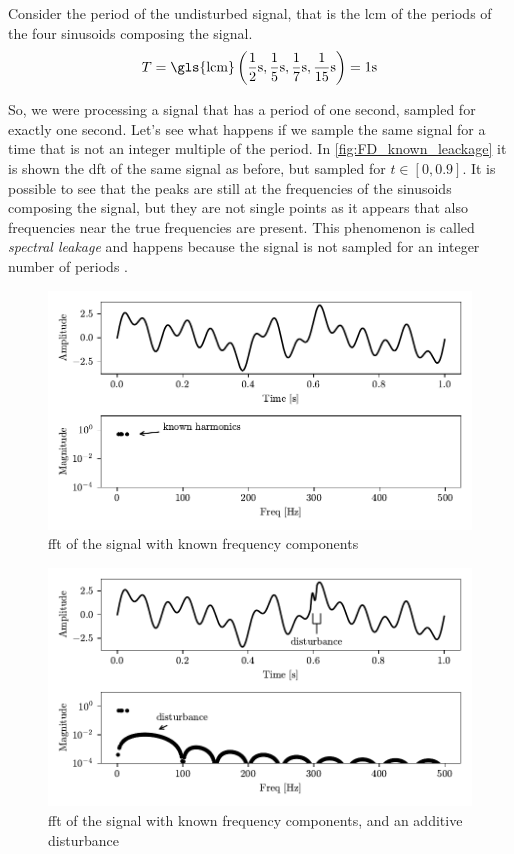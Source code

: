 Consider the period of the undisturbed signal, that is the \gls{lcm} of the periods of the four sinusoids composing the signal.
\[ 
    T = \text{\gls{lcm}} \left( \frac{1}{2} \si{\s},\frac{1}{5}\si{\s},\frac{1}{7}\si{\s},\frac{1}{15}\si{\s} \right) = 1 \si{\s}
\]

So, we were processing a signal that has a period of one second, sampled for exactly one second. Let's see what happens if we sample the same signal for a time that is not an integer multiple of the period. In \autoref{fig:FD_known_leackage} it is shown the \gls{dft} of the same signal as before, but sampled for $t \in [0, 0.9]$. It is possible to see that the peaks are still at the frequencies of the sinusoids composing the signal, but they are not single points as it appears that also frequencies near the true frequencies are present. This phenomenon is called \emph{spectral leakage} and happens because the signal is not sampled for an integer number of periods \cite{SpectralLeakage}. 


\begin{figure}
    \centering
    \includegraphics[width=\textwidth]{images/FeatureExtraction/FD_known.pdf}
    \caption{\gls{fft} of the signal with known frequency components}
    \label{fig:FD_known}
\end{figure}

\begin{figure}
    \centering
    \includegraphics[scale=1]{images/FeatureExtraction/FD_known_dist.pdf}
    \caption{\gls{fft} of the signal with known frequency components, and an additive disturbance}
    \label{fig:FD_known_dist}
\end{figure}

